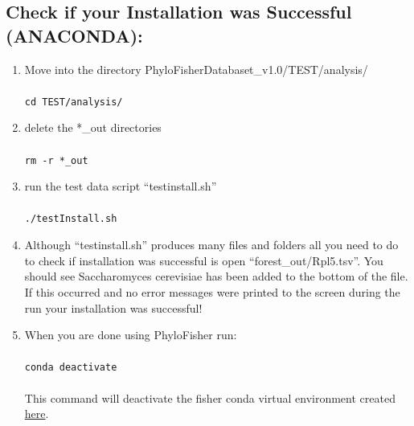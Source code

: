 \documentclass{article}
\def\code#1{\texttt{#1}}
\begin{document}
        
    \subsection{Check if your Installation was Successful (ANACONDA):}
    \begin{enumerate}
        \item Move into the directory PhyloFisherDatabaset\_v1.0/TEST/analysis/
        \\\\
        \code{cd TEST/analysis/}
        \item delete the *\_out directories
        \\\\
        \code{rm -r *\_out}
        \item run the test data script “testinstall.sh”
        \\\\
        \code{./testInstall.sh}
        \item Although “testinstall.sh” produces many files and folders all you need to do to check if installation was successful is open “forest\_out/Rpl5.tsv”. You should see Saccharomyces cerevisiae has been added to the bottom of the file. If this occurred and no error messages were printed to the screen during the run your installation was successful!
        \item When you are done using PhyloFisher run:
	    \\\\
	    \code{conda deactivate}
        \\\\
        This command will deactivate the fisher conda virtual environment created \hyperref[step:env]{here}.

    \end{enumerate}
\end{document}
